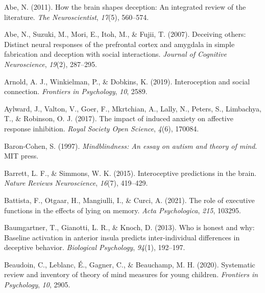 \documentclass[
  man,mask,floatsintext]{apa6}
\newlength{\cslhangindent}
\newlength{\cslentryspacingunit} %
\newenvironment{CSLReferences}[2] %
 {%
  \setlength{\parindent}{0pt}
  \ifodd #1
  \let\oldpar\par
  \def\par{\hangindent=\cslhangindent\oldpar}
  \fi
  \setlength{\parskip}{#2\cslentryspacingunit}
 }%
 {}
\begin{document}
\hypertarget{refs}{}
\begin{CSLReferences}{1}{0}
\leavevmode{}%
Abe, N. (2011). How the brain shapes deception: An integrated review of the literature. \emph{The Neuroscientist}, \emph{17}(5), 560--574.

\leavevmode{}%
Abe, N., Suzuki, M., Mori, E., Itoh, M., \& Fujii, T. (2007). Deceiving others: Distinct neural responses of the prefrontal cortex and amygdala in simple fabrication and deception with social interactions. \emph{Journal of Cognitive Neuroscience}, \emph{19}(2), 287--295.

\leavevmode{}%
Arnold, A. J., Winkielman, P., \& Dobkins, K. (2019). Interoception and social connection. \emph{Frontiers in Psychology}, \emph{10}, 2589.

\leavevmode{}%
Aylward, J., Valton, V., Goer, F., Mkrtchian, A., Lally, N., Peters, S., Limbachya, T., \& Robinson, O. J. (2017). The impact of induced anxiety on affective response inhibition. \emph{Royal Society Open Science}, \emph{4}(6), 170084.

\leavevmode{}%
Baron-Cohen, S. (1997). \emph{Mindblindness: An essay on autism and theory of mind}. MIT press.

\leavevmode{}%
Barrett, L. F., \& Simmons, W. K. (2015). Interoceptive predictions in the brain. \emph{Nature Reviews Neuroscience}, \emph{16}(7), 419--429.

\leavevmode{}%
Battista, F., Otgaar, H., Mangiulli, I., \& Curci, A. (2021). The role of executive functions in the effects of lying on memory. \emph{Acta Psychologica}, \emph{215}, 103295.

\leavevmode{}%
Baumgartner, T., Gianotti, L. R., \& Knoch, D. (2013). Who is honest and why: Baseline activation in anterior insula predicts inter-individual differences in deceptive behavior. \emph{Biological Psychology}, \emph{94}(1), 192--197.

\leavevmode{}%
Beaudoin, C., Leblanc, É., Gagner, C., \& Beauchamp, M. H. (2020). Systematic review and inventory of theory of mind measures for young children. \emph{Frontiers in Psychology}, \emph{10}, 2905.


\end{CSLReferences}
\end{document}
